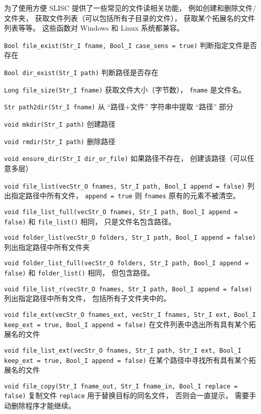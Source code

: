 
\begin{issues}
\issueDraft
\end{issues}

为了使用方便 SLISC 提供了一些常见的文件读相关功能， 例如创建和删除文件/文件夹， 获取文件列表（可以包括所有子目录的文件）， 获取某个拓展名的文件列表等等。 这些函数对 Windows 和 Linux 系统都兼容。

\verb|Bool file_exist(Str_I fname, Bool_I case_sens = true)| 判断指定文件是否存在

\verb|Bool dir_exist(Str_I path)| 判断路径是否存在

\verb|Long file_size(Str_I fname)| 获取文件大小（字节数）， \verb|fname| 是文件名。

\verb|Str path2dir(Str_I fname)| 从 “路径+文件” 字符串中提取 “路径” 部分

\verb|void mkdir(Str_I path)| 创建路径

\verb|void rmdir(Str_I path)| 删除路径

\verb|void ensure_dir(Str_I dir_or_file)| 如果路径不存在， 创建该路径（可以任意多层）

\verb|void file_list(vecStr_O fnames, Str_I path, Bool_I append = false)| 列出指定路径中所有文件， \verb|append = true| 则 \verb|fnames| 原有的元素不被清空。

\verb|void file_list_full(vecStr_O fnames, Str_I path, Bool_I append = false)| 和 \verb|file_list()| 相同， 只是文件名包含路径。

\verb|void folder_list(vecStr_O folders, Str_I path, Bool_I append = false)| 列出指定路径中所有文件夹

\verb|void folder_list_full(vecStr_O folders, Str_I path, Bool_I append = false)| 和 \verb|folder_list()| 相同， 但包含路径。

\verb|void file_list_r(vecStr_O fnames, Str_I path, Bool_I append = false)| 列出指定路径中所有文件， 包括所有子文件夹中的。

\verb|void file_ext(vecStr_O fnames_ext, vecStr_I fnames, Str_I ext, Bool_I keep_ext = true, Bool_I append = false)| 在文件列表中选出所有具有某个拓展名的文件

\verb|void file_list_ext(vecStr_O fnames, Str_I path, Str_I ext, Bool_I keep_ext = true, Bool_I append = false)| 在某个路径中寻找所有具有某个拓展名的文件

\verb|void file_copy(Str_I fname_out, Str_I fname_in, Bool_I replace = false)| 复制文件 \verb|replace| 用于替换目标的同名文件， 否则会一直提示， 需要手动删除程序才能继续。

